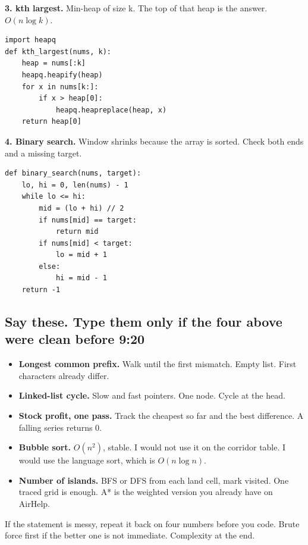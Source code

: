 \documentclass[a4paper,9.5pt]{extarticle}
\begin{document}
\textbf{3. kth largest.} Min-heap of size k. The top of that heap is the answer. $O(n \log k)$.
\begin{verbatim}
import heapq
def kth_largest(nums, k):
    heap = nums[:k]
    heapq.heapify(heap)
    for x in nums[k:]:
        if x > heap[0]:
            heapq.heapreplace(heap, x)
    return heap[0]
\end{verbatim}

\textbf{4. Binary search.} Window shrinks because the array is sorted. Check both ends and a missing target.
\begin{verbatim}
def binary_search(nums, target):
    lo, hi = 0, len(nums) - 1
    while lo <= hi:
        mid = (lo + hi) // 2
        if nums[mid] == target:
            return mid
        if nums[mid] < target:
            lo = mid + 1
        else:
            hi = mid - 1
    return -1
\end{verbatim}

\subsection{Say these. Type them only if the four above were clean before 9:20}
\begin{itemize}
  \item \textbf{Longest common prefix.} Walk until the first mismatch. Empty list. First characters already differ.
  \item \textbf{Linked-list cycle.} Slow and fast pointers. One node. Cycle at the head.
  \item \textbf{Stock profit, one pass.} Track the cheapest so far and the best difference. A falling series returns 0.
  \item \textbf{Bubble sort.} $O(n^2)$, stable. I would not use it on the corridor table. I would use the language sort, which is $O(n \log n)$.
  \item \textbf{Number of islands.} BFS or DFS from each land cell, mark visited. One traced grid is enough. A* is the weighted version you already have on AirHelp.
\end{itemize}
If the statement is messy, repeat it back on four numbers before you code. Brute force first if the better one is not immediate. Complexity at the end.
\end{document}
